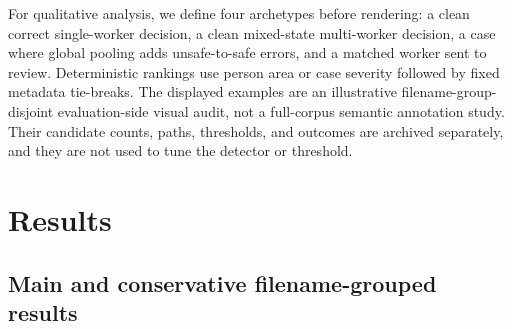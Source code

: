\documentclass[iicol,pdflatex,sn-mathphys-num]{sn-jnl}
\begin{document}
For qualitative analysis, we define four archetypes before rendering: a clean correct single-worker decision, a clean mixed-state multi-worker decision, a case where global pooling adds unsafe-to-safe errors, and a matched worker sent to review. Deterministic rankings use person area or case severity followed by fixed metadata tie-breaks. The displayed examples are an illustrative filename-group-disjoint evaluation-side visual audit, not a full-corpus semantic annotation study. Their candidate counts, paths, thresholds, and outcomes are archived separately, and they are not used to tune the detector or threshold.

\section{Results}\label{sec:results}

\subsection{Main and conservative filename-grouped results}
\end{document}
